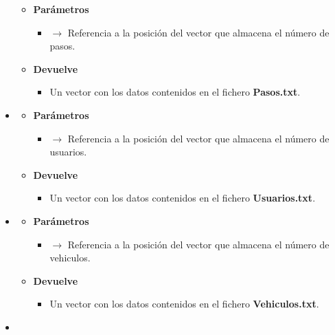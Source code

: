 \begin{itemize}
\begin{itemize}
		\item \textbf{Parámetros}
		\begin{itemize}
			\item {} $\rightarrow$ Referencia a la posición del vector que almacena el número de pasos.
		\end{itemize}
		\item \textbf{Devuelve}
		\begin{itemize}
			\item Un vector con los datos contenidos en el fichero \textbf{Pasos.txt}.
		\end{itemize}
	\end{itemize}
	\newpage
	\item\label{def:initusuarios}
	\begin{itemize}
		\item \textbf{Parámetros}
		\begin{itemize}
			\item {} $\rightarrow$ Referencia a la posición del vector que almacena el número de usuarios.
		\end{itemize}
		\item \textbf{Devuelve}
		\begin{itemize}
			\item Un vector con los datos contenidos en el fichero \textbf{Usuarios.txt}.
		\end{itemize}
	\end{itemize}
	\item\label{def:initvehiculos}
	\begin{itemize}
		\item \textbf{Parámetros}
		\begin{itemize}
			\item {} $\rightarrow$ Referencia a la posición del vector que almacena el número de vehiculos.
		\end{itemize}
		\item \textbf{Devuelve}
		\begin{itemize}
			\item Un vector con los datos contenidos en el fichero \textbf{Vehiculos.txt}.
		\end{itemize}
	\end{itemize}
	\item\label{def:initviajes}
	\begin{itemize}

\end{itemize}
\end{itemize}
